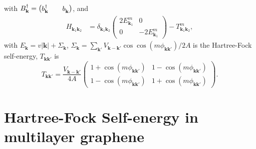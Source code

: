 \documentclass[english,aps,prd,nofootinbib,twocolumn]{revtex4-1}
\begin{document}
with
$B_{\mathbf{k }}^{\textcolor{black}{\dagger}} =
\begin{pmatrix}
b_{\mathbf{k }}^{\textcolor{black}{\dagger}}
&&
b_{\mathbf{k }}^{\textcolor{white}{\dagger}}
\end{pmatrix}$, and 
\begin{equation}
\label{eq:HP-Explicit-Hamiltonian}
\begin{split}
H_{\mathbf{k}_{1}\mathbf{k}_{2}} &= 
\delta_{\mathbf{k}_{1}\mathbf{k}_{2}}
\begin{pmatrix}
2 E^{m}_{\mathbf{k}_{1}}	&	0	\\
0   &   -2 E^{m}_{\mathbf{k}_{1}}
\end{pmatrix} - 
T^{m}_{\mathbf{k}_{1}\mathbf{k}_{2}},
\end{split}
\end{equation}
with $E_{\mathbf{k}} = v|\mathbf{k}| + \Sigma_{\mathbf{k}}$, $\Sigma_{\mathbf{k}} = \sum_{ \mathbf{k'}} 
V_{\mathbf{k-k'}}\cos \cos (m\phi_{\mathbf{k }\mathbf{k'}})/2A$ is the Hartree-Fock self-energy, $T_{\mathbf{kk'}}$ is
\begin{equation}
\label{eq:Interacion-matrix}
T_{\mathbf{kk'}} = 
\frac{V_{\mathbf{k-k'}}}{4A} 
\begin{pmatrix}
    1+\cos (m\phi_{\mathbf{k }\mathbf{k'}})  &    
    1-\cos (m\phi_{\mathbf{k }\mathbf{k'}}) \\  
    1-\cos (m\phi_{\mathbf{k }\mathbf{k'}})  &
    1+\cos (m\phi_{\mathbf{k }\mathbf{k'}})
\end{pmatrix} .   
\end{equation}

\section{Hartree-Fock Self-energy in multilayer graphene}
\label{sect:Self-Energy}
\end{document}
